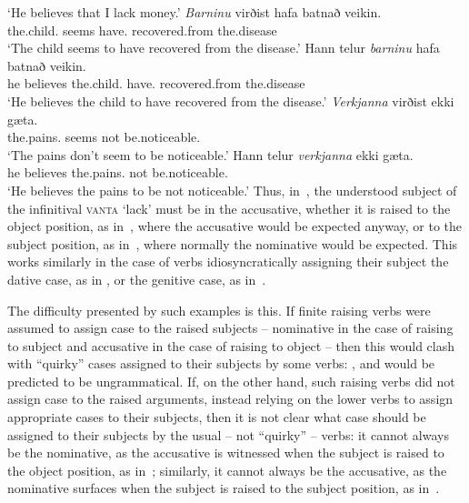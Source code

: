 \documentclass[output=paper
 	        ,biblatex
                ,babelshorthands
                ,newtxmath
                ,draftmode
                ,colorlinks, citecolor=brown
]{langscibook}
\begin{document}
\glt `He believes that I lack money.'
\zl
\eal
\label{isl:dat}
\ex
\gll  \emph{Barninu} virðist hafa batnað veikin. \\
      the.child.\DAT{} seems have.\INF{} recovered.from the.disease\\\hfill{}
\glt `The child seems to have recovered from the disease.'
\ex
\gll Hann telur \emph{barninu} hafa batnað veikin. \\
      he believes the.child.\DAT{} have.\INF{} recovered.from the.disease\\
\glt `He believes the child to have recovered from the disease.'
\zl
\eal\label{isl:gen}
\ex
\gll  \emph{Verkjanna} virðist ekki g\ae{}ta. \\
      the.pains.\GEN{} seems not be.noticeable.\INF{}\\\hfill{}
\glt `The pains don't seem to be noticeable.'
\ex
\gll Hann telur \emph{verkjanna} ekki g\ae{}ta. \\
      he believes the.pains.\GEN{} not be.noticeable.\INF{}\\
\glt `He believes the pains to be not noticeable.'
\zl
Thus, in~, the understood subject of the infinitival \textsc{vanta} `lack’ must be in the accusative, whether it is raised to the object position, as in~, where the accusative would be expected anyway, or to the subject position, as in~, where normally the nominative would be expected.  This works similarly in the case of verbs idiosyncratically assigning their subject the dative case, as in , or the genitive case, as in~.

The difficulty presented by such examples is this. If finite raising verbs were assumed to assign case to the raised subjects – nominative in the case of raising to subject and accusative in the case of raising to object – then this would clash with “quirky” cases assigned to their subjects by some verbs: ,  and  would be predicted to be ungrammatical.  If, on the other hand, such raising verbs did not assign case to the raised arguments, instead relying on the lower verbs to assign appropriate cases to their subjects, then it is not clear what case should be assigned to their subjects by the usual – not “quirky” – verbs: it cannot always be the nominative, as the accusative is witnessed when the subject is raised to the object position, as in~; similarly, it cannot always be the accusative, as the nominative surfaces when the subject is raised to the subject position, as in~.
\end{document}
